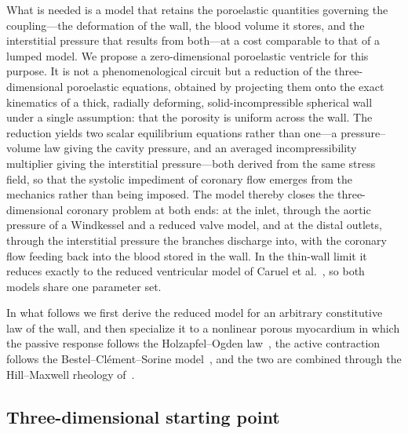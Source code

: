 \documentclass[11pt,a4paper]{article}
\begin{document}
What is needed is a model that retains the poroelastic quantities governing the coupling---the deformation of the wall, the blood volume it stores, and the interstitial pressure that results from both---at a cost comparable to that of a lumped model. We propose a zero-dimensional poroelastic ventricle for this purpose. It is not a phenomenological circuit but a reduction of the three-dimensional poroelastic equations, obtained by projecting them onto the exact kinematics of a thick, radially deforming, solid-incompressible spherical wall under a single assumption: that the porosity is uniform across the wall. The reduction yields two scalar equilibrium equations rather than one---a pressure--volume law giving the cavity pressure, and an averaged incompressibility multiplier giving the interstitial pressure---both derived from the same stress field, so that the systolic impediment of coronary flow emerges from the mechanics rather than being imposed. The model thereby closes the three-dimensional coronary problem at both ends: at the inlet, through the aortic pressure of a Windkessel and a reduced valve model, and at the distal outlets, through the interstitial pressure the branches discharge into, with the coronary flow feeding back into the blood stored in the wall. In the thin-wall limit it reduces exactly to the reduced ventricular model of Caruel et al.~\cite{Caruel2014}, so both models share one parameter set.

In what follows we first derive the reduced model for an arbitrary constitutive law of the wall, and then specialize it to a nonlinear porous myocardium in which the passive response follows the Holzapfel--Ogden law~\cite{Holzapfel2009}, the active contraction follows the Bestel--Cl\'ement--Sorine model~\cite{Bestel2001}, and the two are combined through the Hill--Maxwell rheology of~\cite{Chapelle2012}.

\subsection{Three-dimensional starting point}
\label{sec:3d}
\end{document}
